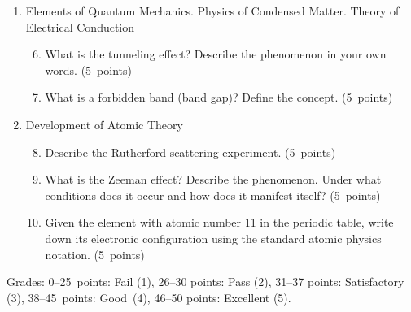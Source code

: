 \documentclass[a4paper,12pt]{letter}
\begin{document}
\begin{enumerate}[label=\Roman*.]
\begin{enumerate}[label=\arabic*.]
\end{enumerate}
  

\item Elements of Quantum Mechanics. Physics of Condensed Matter. Theory of Electrical Conduction

\begin{enumerate}[label=\arabic*.]
\setcounter{enumii}{5} %

\item What is the tunneling effect? Describe the phenomenon in your own words. \hfill (5~points)

\item What is a forbidden band (band gap)? Define the concept. \hfill (5~points)

\end{enumerate}

  
\item Development of Atomic Theory

\begin{enumerate}[label=\arabic*.]
\setcounter{enumii}{7} %

\item Describe the Rutherford scattering experiment. \hfill (5~points)

\item What is the Zeeman effect? Describe the phenomenon. Under what conditions does it occur and how does it manifest itself? \hfill (5~points)

\item Given the element with atomic number 11 in the periodic table, write down its electronic configuration using the standard atomic physics notation. \hfill (5~points)
  
\end{enumerate}

\end{enumerate}


Grades: 0–25~points: Fail (1), 26–30 points: Pass (2), 31–37 points: Satisfactory (3), 38–45~points: Good~(4), 46–50 points: Excellent (5).


\vfill
\end{document}

